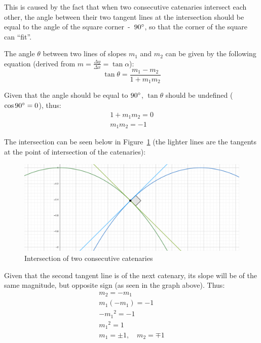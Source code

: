 \documentclass[12pt]{article}
\begin{document}
        This is caused by the fact that when two consecutive catenaries intersect each other, the angle between their two tangent lines at the intersection should be equal to the angle of the square corner~-~$90\degree$, so that the corner of the square can ``fit''. 

        The angle $\theta$ between two lines of slopes $m_1$ and $m_2$ can be given by the following equation (derived from $m=\frac{\Delta y}{\Delta x}=\tan\alpha$):
        \begin{equation}\label{eq:lines_angle}
            \tan\theta = \frac{m_1 - m_2}{1 + m_1 m_2}
        \end{equation}

        Given that the angle should be equal to $90\degree$, $\tan\theta$ should be undefined ($\cos90\degree = 0$), thus:
        \begin{align}
            1 + m_1 m_2 = 0 \\
            m_1 m_2 = -1
        \end{align}

        The intersection can be seen below in Figure~\ref{fig:intersection} (the lighter lines are the tangents at the point of intersection of the catenaries):

        \begin{figure}[H]
            \centering
            \includegraphics[width=0.6\linewidth]{images/slope_1.png}
            \caption[Intersection of two consecutive catenaries]{Intersection of two consecutive catenaries\footnotemark}\label{fig:intersection}
        \end{figure}

        Given that the second tangent line is of the next catenary, its slope will be of the same magnitude, but opposite sign (as seen in the graph above). Thus:
        \begin{align}
            m_2 = - m_1 \label{eq:tangent_intersection} \\
            m_1 (-m_1) = -1 \\
            - {m_1}^2 = -1 \\
            {m_1}^2 = 1 \\
            m_1 = \pm 1, \quad m_2 = \mp 1
        \end{align} 
\end{document}
